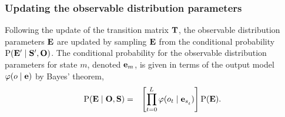 \documentclass[aps,pre,twocolumn,superscriptaddress,nofootinbib,longbibliography]{revtex4-1}
\newcommand{\bfv}[1]{{\mbox{\boldmath{$#1$}}}}
\newcommand{\bfm}[1]{{\bf #1}}
\renewcommand{\Pr}{\mathrm{P}}
\begin{document}
{%
%

\subsubsection{Updating the observable distribution parameters}

Following the update of the transition matrix $\bfm{T}$, the observable distribution parameters $\bfm{E}$ are updated by sampling $\bfm{E}$ from the conditional probability $\Pr(\bfm{E}' \mid \bfm{S}', \bfm{O})$.
The conditional probability for the observable distribution parameters for state $m$, denoted $\bfm{e}_m$, is given in terms of the output model $\varphi(o \mid \bfm{e})$ by Bayes' theorem,
\begin{eqnarray}
\Pr(\bfm{E} \mid \bfm{O}, \bfm{S}) &=& \left[\prod_{t=0}^{L^{}} \varphi(o_{t} \mid \bfm{e}_{s^{}_{t}}) \right] \Pr(\bfm{E}) \label{equation:conditional-emission-probability} .
\end{eqnarray}

}
\end{document}
